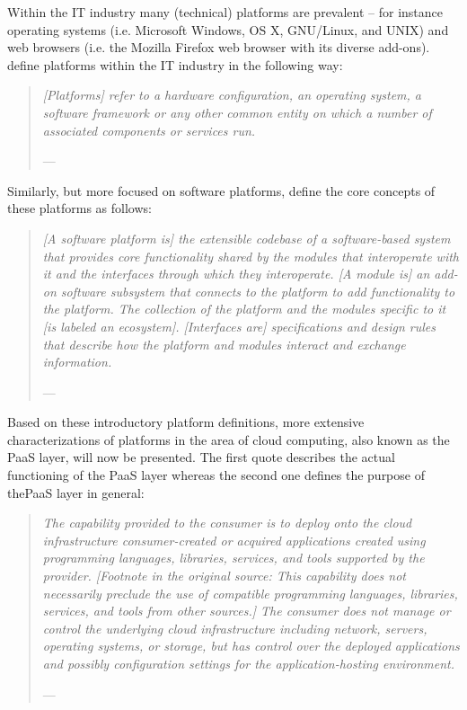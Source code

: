Within the \ac{IT} industry many (technical) platforms are prevalent -- for instance operating systems (i.e. Microsoft Windows, OS X, GNU/Linux, and UNIX) and web browsers (i.e. the Mozilla Firefox web browser with its diverse add-ons). \citet{Poel2007} define platforms within the \ac{IT} industry in the following way:

\begin{quotation}{\slshape 
[Platforms] refer to a hardware configuration, an operating system, a software framework or any other common entity on which a number of associated components or services run.}
\vspace*{-7pt}
\begin{flushright}
	--- \citealp[p. 88]{Poel2007}
\end{flushright}
\end{quotation}

Similarly, but more focused on software platforms, \citet{Tiwana2010} define the core concepts of these platforms as follows:

\begin{quotation}{\slshape 
[A software platform is] the extensible codebase of a software-based system that provides core functionality shared by the modules that interoperate with it and the interfaces through which they interoperate. [A module is] an add-on software subsystem that connects to the platform to add functionality to the platform. The collection of the platform and the modules specific to it [is labeled an ecosystem]. [Interfaces are] specifications and design rules that describe how the platform and modules interact and exchange information.}
\vspace*{-7pt}
\begin{flushright}
	--- \citealp[p. 676]{Tiwana2010}
\end{flushright}
\end{quotation}

Based on these introductory platform definitions, more extensive characterizations of platforms in the area of cloud computing, also known as the \ac{PaaS} layer, will now be presented. The first quote describes the actual functioning of the \ac{PaaS} layer whereas the second one defines the purpose of the\ac{PaaS} layer in general:

\begin{quotation}{\slshape 
The capability provided to the consumer is to deploy onto the cloud infrastructure consumer-created or acquired applications created using programming languages, libraries, services, and tools supported by the provider. [Footnote in the original source: This capability does not necessarily preclude the use of compatible programming languages, libraries, services, and tools from other sources.] The consumer does not manage or control the underlying cloud infrastructure including network, servers, operating systems, or storage, but has control over the deployed applications and possibly configuration settings for the application-hosting environment.}
\vspace*{-7pt}
\begin{flushright}
	--- \citealp[pp. 2-3]{Mell2011}
\end{flushright}
\end{quotation}

